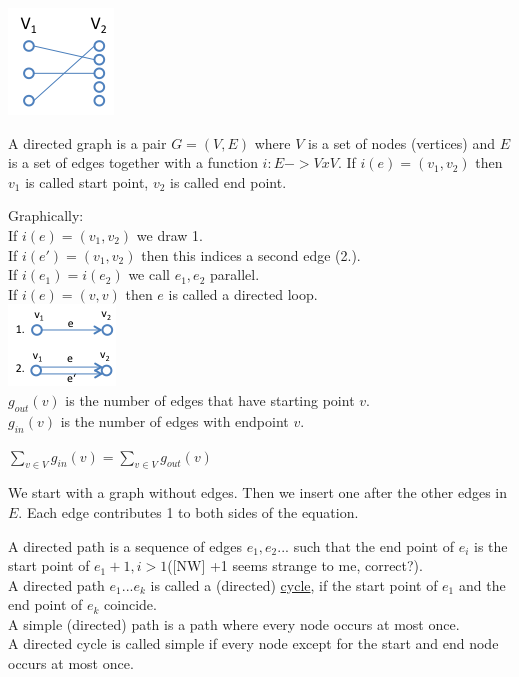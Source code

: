 \begin{example*}
    \includegraphics{diagrams/def14_example1.png}
\end{example*}

\begin{definition}
    A directed graph is a pair $G = (V,E)$ where $V$ is a set of nodes (vertices) and $E$ is a set of edges together 
    with a function $i: E -> V x V$. If $i(e) = (v_{1},v_{2})$ then $v_{1}$ is called start point, $v_{2}$ is called end point.
\end{definition}
Graphically: \\[3mm]
If $i(e) = (v_{1},v_{2})$ we draw 1. \\
If $i(e') = (v_{1},v_{2})$ then this indices a second edge (2.). \\
If $i(e_{1}) = i(e_{2})$ we call $e_{1},e_{2}$ parallel. \\
If $i(e) = (v,v)$ then $e$ is called a directed loop. \\
\includegraphics{diagrams/def15_directd_graph.png} \\
$g_{out}(v)$ is the number of edges that have starting point $v$. \\
$g_{in}(v)$ is the number of edges with endpoint $v$.

\begin{lemma}
    $\displaystyle\sum\limits_{v \in V} g_{in}(v) = \displaystyle\sum\limits_{v \in V} g_{out}(v)$
\end{lemma}

\begin{prooof}
    We start with a graph without edges. Then we insert one after the other edges in $E$. 
    Each edge contributes 1 to both sides of the equation.
\end{prooof}

\begin{definition}
    A directed path is a sequence of edges $e_{1},e_{2}...$ such that the end point of $e_{i}$ is the start point of
    $e_{1} +1, i > 1$([NW] +1 seems strange to me, correct?). \\[3mm]

    A directed path $e_{1}...e_{k}$ is called a (directed) \underline{cycle}, if the start point of $e_{1}$ and
    the end point of $e_{k}$ coincide. \\
    A simple (directed) path is a path where every node occurs at most once. \\
    A directed cycle is called simple if every node except for the start and end node occurs at most once.
\end{definition}

